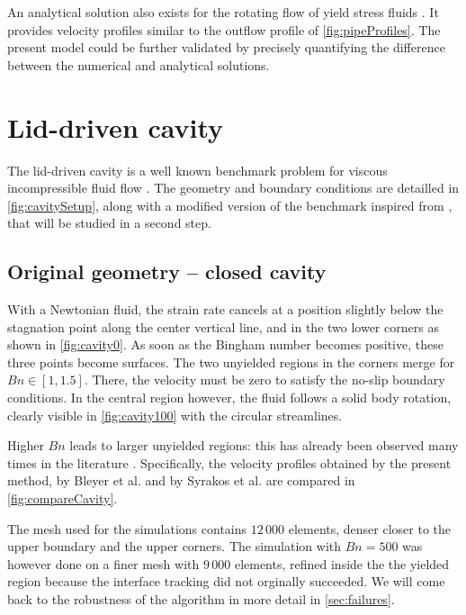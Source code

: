 \documentclass[11 pt]{report}
\begin{document}
An analytical solution also exists for the rotating flow of yield stress fluids \cite{circularProfile}. It provides velocity profiles similar to the outflow profile of \cref{fig:pipeProfiles}. The present model could be further validated by precisely quantifying the difference between the numerical and analytical solutions.

\pagebreak
\section{Lid-driven cavity}

The lid-driven cavity is a well known benchmark problem for viscous incompressible fluid flow \cite{FEMfluid}. The geometry and boundary conditions are detailled in \cref{fig:cavitySetup}, along with a modified version of the benchmark inspired from \cite{hoffmann}, that will be studied in a second step.



\subsection{Original geometry -- closed cavity}

With a Newtonian fluid, the strain rate cancels at a position slightly below the stagnation point along the center vertical line, and in the two lower corners as shown in \cref{fig:cavity0}. As soon as the Bingham number becomes positive, these three points become surfaces. The two unyielded regions in the corners merge for $Bn\in[1,1.5]$. There, the velocity must be zero to satisfy the no-slip boundary conditions. In the central region however, the fluid follows a solid body rotation, clearly visible in \cref{fig:cavity100} with the circular streamlines.

Higher $Bn$ leads to larger unyielded regions: this has already been observed many times in the literature \cite{Bleyer,Syrakos,Treskatis}. Specifically, the velocity profiles obtained by the present method, by Bleyer et al. \cite{Bleyer} and by Syrakos et al. \cite{Syrakos} are compared in \cref{fig:compareCavity}. 

The mesh used for the simulations contains $12\,000$ elements, denser closer to the upper boundary and the upper corners. The simulation with $Bn=500$ was however done on a finer mesh with $9\,000$ elements, refined inside the the yielded region because the interface tracking did not orginally succeeded. We will come back to the robustness of the algorithm in more detail in \cref{sec:failures}.
\end{document}
